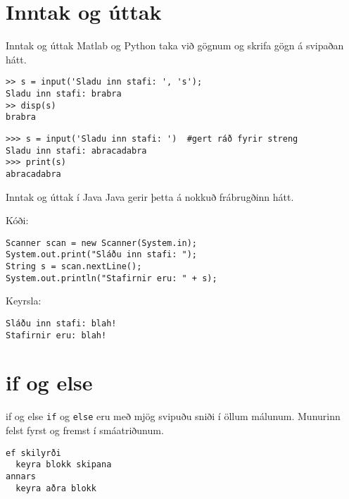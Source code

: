 \documentclass{beamer}
\begin{document}
\section{Inntak og úttak}

\begin{frame}[fragile]{Inntak og úttak}
\vspace{\baselineskip}
Matlab og Python taka við gögnum og skrifa gögn á svipaðan hátt.
\begin{verbatim}
>> s = input('Sladu inn stafi: ', 's');
Sladu inn stafi: brabra
>> disp(s)
brabra
\end{verbatim}

\begin{verbatim}
>>> s = input('Sladu inn stafi: ')  #gert ráð fyrir streng
Sladu inn stafi: abracadabra
>>> print(s)
abracadabra
\end{verbatim}

\end{frame}

\begin{frame}[fragile]{Inntak og úttak í Java}
\vspace{\baselineskip}
Java gerir þetta á nokkuð frábrugðinn hátt. 

Kóði:
\begin{verbatim}
Scanner scan = new Scanner(System.in);
System.out.print("Sláðu inn stafi: ");
String s = scan.nextLine();
System.out.println("Stafirnir eru: " + s);
\end{verbatim}

Keyrsla:
\begin{verbatim}
Sláðu inn stafi: blah!
Stafirnir eru: blah!
\end{verbatim}
\end{frame}

\section{if og else}

\begin{frame}[fragile]{if og else}
\texttt{if} og \texttt{else} eru með mjög svipuðu sniði í öllum málunum. Munurinn felst fyrst og fremst í smáatriðunum.

\begin{verbatim}
ef skilyrði
  keyra blokk skipana
annars 
  keyra aðra blokk
\end{verbatim}

\end{frame}
\end{document}
